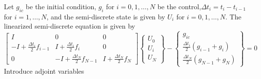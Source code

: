 \documentclass[10pt]{article}
\begin{document}
Let $g_{ic}$ be the initial condition, $g_i$ for $i=0,1,\dots,N$ be the
control,$ \Delta t_i = t_i - t_{i-1}$ for $i=1,\dots,N$, and the semi-discrete
state is given by $U_i$ for $i=0,1,\dots,N$.  The linearized semi-discrete
equation is given by
\begin{equation}
\left[ \begin{array}{ccc} 
I & 0 & 0 \\
-I + \frac{\Delta t_i}{2} f_{i-1} & I + \frac{\Delta t_i}{2} f_i & 0 \\
0 & -I + \frac{\Delta t_N}{2} f_{N-1} & I + \frac{\Delta t_N}{2} f_N
\end{array} \right] 
\left\{\begin{array}{c} U_0 \\ U_i \\ U_N \end{array} \right\} -
\left\{\begin{array}{c} g_{ic} \\ \frac{\Delta t_i}{2}(g_{i-1} + g_i) \\ 
\frac{\Delta t_N}{2}(g_{N-1} + g_N)\end{array} \right\} = 0 
\end{equation}
%
Introduce adjoint variables
\end{document}
